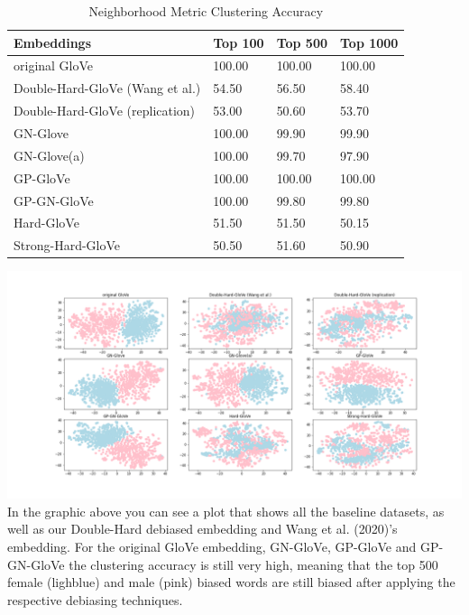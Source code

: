 \documentclass[
  english,
  man,floatsintext]{apa6}
\begin{document}
\begin{table}[tbp]

\begin{center}
\begin{threeparttable}

\caption{\label{tab:table 2}Neighborhood Metric Clustering Accuracy}

\begin{tabular}{llll}
\toprule
Embeddings & Top 100 & Top 500 & Top 1000\\
\midrule
original GloVe & 100.00 & 100.00 & 100.00\\
Double-Hard-GloVe (Wang et al.) & 54.50 & 56.50 & 58.40\\
Double-Hard-GloVe (replication) & 53.00 & 50.60 & 53.70\\
GN-Glove & 100.00 & 99.90 & 99.90\\
GN-Glove(a) & 100.00 & 99.70 & 97.90\\
GP-GloVe & 100.00 & 100.00 & 100.00\\
GP-GN-GloVe & 100.00 & 99.80 & 99.80\\
Hard-GloVe & 51.50 & 51.50 & 50.15\\
Strong-Hard-GloVe & 50.50 & 51.60 & 50.90\\
\bottomrule
\end{tabular}

\end{threeparttable}
\end{center}

\end{table}

\includegraphics{evaluation_results/results_tsne.png}
In the graphic above you can see a plot that shows all the baseline datasets, as well as our Double-Hard debiased embedding and Wang et al. (2020)'s embedding. For the original GloVe embedding, GN-GloVe, GP-GloVe and GP-GN-GloVe the clustering accuracy is still very high, meaning that the top 500 female (lighblue) and male (pink) biased words are still biased after applying the respective debiasing techniques.
\end{document}
